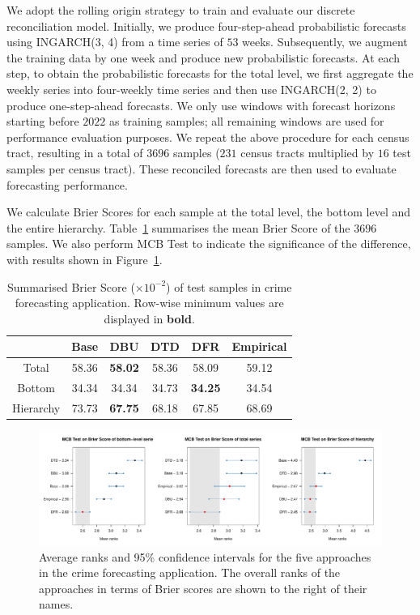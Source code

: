 \documentclass[a4paper,review,12pt,authoryear]{elsarticle}
\theoremstyle{definition}
\begin{document}
     We adopt the rolling origin strategy to train and evaluate our discrete reconciliation model.
     Initially, we produce four-step-ahead probabilistic forecasts using INGARCH(3, 4) from a time series of $53$ weeks.
     Subsequently, we augment the training data by one week and produce new probabilistic forecasts.
     At each step, to obtain the probabilistic forecasts for the total level, we first aggregate the weekly series into four-weekly time series and then use INGARCH(2, 2) to produce one-step-ahead forecasts.
     We only use windows with forecast horizons starting before $2022$ as training samples; all remaining windows are used for performance evaluation purposes.
     We repeat the above procedure for each census tract, resulting in a total of $3696$ samples ($231$ census tracts multiplied by $16$ test samples per census tract).
     These reconciled forecasts are then used to evaluate forecasting performance.

     We calculate Brier Scores for each sample at the total level, the bottom level and the entire hierarchy.
     Table~\ref{tab:crime_bs} summarises the mean Brier Score of the $3696$ samples.
     We also perform MCB Test to indicate the significance of the difference, with results shown in Figure~\ref{fig:application_crime}.

     \begin{table}[h]
       \centering
       \caption{\label{tab:crime_bs}Summarised Brier Score ($\times 10^{-2}$) of test samples in crime forecasting application. Row-wise minimum values are displayed in \textbf{bold}.}
       \begin{tabular}{cccccc}
       \toprule
       ~ & Base & DBU & DTD & DFR & Empirical \\\midrule 
       Total & 58.36 & \textbf{58.02} & 58.36 & 58.09 & 59.12 \\ 
       Bottom & 34.34 & 34.34 & 34.73 & \textbf{34.25} & 34.54 \\ 
       Hierarchy & 73.73 & \textbf{67.75} & 68.18 & {67.85} & 68.69 \\ 
       \bottomrule
       \end{tabular}
       \end{table}

     \begin{figure}[h]
       \caption{\label{fig:application_crime}Average ranks and 95\% confidence intervals for the five approaches in the crime forecasting application. The overall ranks of the approaches in terms of Brier scores are shown to the right of their names.}
       \centering
       \includegraphics[width=\textwidth]{figures/dc_crime_mcb.pdf}
     \end{figure}
\end{document}
